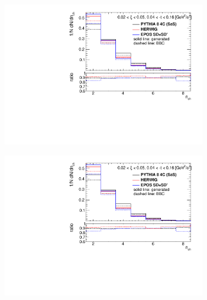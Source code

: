 \begin{figure}[H]
	\begin{subfigure}{.49\textwidth}
		\includegraphics[width=0.97\textwidth,page=4]{chapters/chrgSTAR/img/bbcCorrection/xi_bbc.pdf}
	\end{subfigure}
	\hfill
	\begin{subfigure}{.49\textwidth}
		\includegraphics[width=0.97\textwidth,page=9]{chapters/chrgSTAR/img/bbcCorrection/xi_bbc.pdf}
	\end{subfigure}
	\begin{subfigure}{.49\textwidth}

\end{subfigure}
\end{figure}
